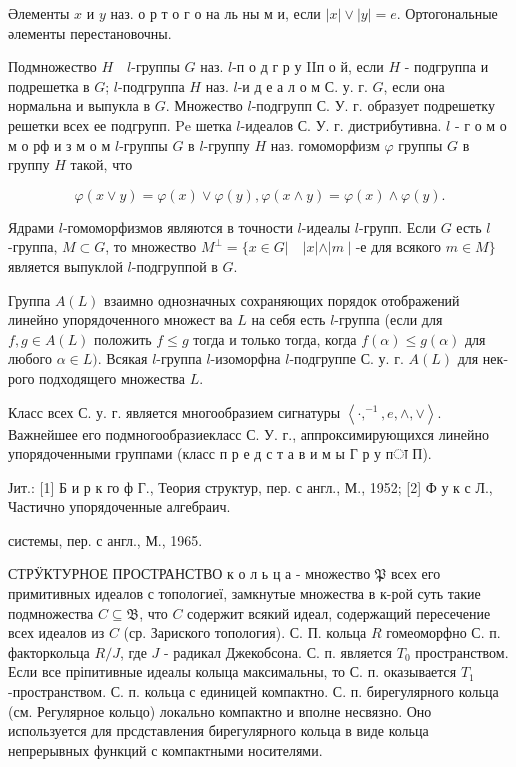 \documentclass[10pt]{article}
\begin{document}
Әлементы $x$ и $y$ наз. о р т о г о на ль ны м и, если $|x| \vee|y|=e$. Ортогональные әлементы перестановочны.



Подмножество $H \quad l$-группы $G$ наз. $l$-п о д г р у IIп о й, если $H$ - подгруппа и подрешетка в $G$; $l$-подгруппа $H$ наз. $l$-и д е а л о м С. у. г. $G$, если она нормальна и выпукла в $G$. Множество $l$-подгрупп С. У. г. образует подрешетку решетки всех ее подгрупп. $\mathrm{Pe}$ шетка $l$-идеалов С. У. г. дистрибутивна. $l$ - г о м о м о рф и з м о м $l$-группы $G$ в $l$-группу $H$ наз. гомоморфизм $\varphi$ группы $G$ в группу $H$ такой, что



\[

\varphi(x \vee y)=\varphi(x) \vee \varphi(y), \varphi(x \wedge y)=\varphi(x) \wedge \varphi(y) .

\]



Ядрами $l$-гомоморфизмов являются в точности $l$-идеалы $l$-групп. Если $G$ есть $l$-группа, $M \subset G$, то множество $M^{\perp}=\{x \in G|\quad| x|\wedge| m \mid$-е для всякого $m \in M\}$ является выпуклой $l$-подгруппой в $G$.



Группа $A(L)$ взаимно однозначных сохраняющих порядок отображений линейно упорядоченного множест ва $L$ на себя есть $l$-группа (если для $f, g \in A(L)$ положить $f \leqslant g$ тогда и только тогда, когда $f(\alpha) \leqslant g(\alpha)$ для любого $\alpha \in L)$. Всякая $l$-группа $l$-изоморфна $l$-подгруппе С. у. г. $A(L)$ для нек-рого подходящего множества $L$.



Класс всех С. у. г. является многообразием сигнатуры $\left\langle\cdot,^{-1}, e, \wedge, \vee\right\rangle$. Важнейшее его подмногообразиекласс С. У. г., аппроксимирующихся линейно упорядоченными группами (класс п р е д с т а в и м ы Г р у пा П).



Јит.: [1] Б и р к го ф Г., Теория структур, пер. с англ., М., 1952; [2] Ф у к с Л., Частично упорядоченные алгебраич.

системы, пер. с англ., М., 1965.



СТРӰКТУРНОЕ ПРОСТРАНСТВО к о л ь ц а - множество $\mathfrak{P}$ всех его примитивных идеалов с топологиеї, замкнутые множества в к-рой суть такие подмножества $C \subseteq \mathfrak{B}$, что $C$ содержит всякий идеал, содержащий пересечение всех идеалов из $C$ (ср. Зариского топология). С. П. кольца $R$ гомеоморфно С. п. факторкольца $R / J$, где $J$ - радикал Джекобсона. С. п. является $T_{0}$ пространством. Если все пріпитивные идеалы колыца максимальны, то С. п. оказывается $T_{1}$-пространством. С. п. кольца с единицей компактно. С. п. бирегулярного кольца (см. Регулярное кольцо) локально компактно и вполне несвязно. Оно используется для прсдставления бирегулярного кольца в виде кольца непрерывных функций с компактными носителями.
\end{document}
